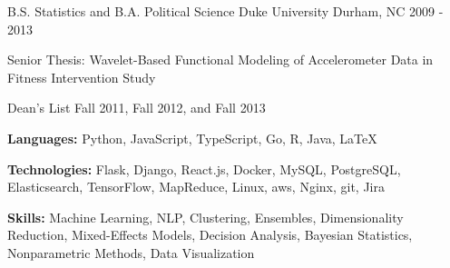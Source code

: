 \documentclass[11pt, a4paper]{awesome-cv}
\begin{document}
\makecvheader

\begin{cventries}
  \vspace{.5 mm}
  \cventry
    {B.S. Statistics and B.A. Political Science}
    {Duke University}
    {Durham, NC}
    {2009 - 2013}
    {
      \begin{cvitems}
        \item{Senior Thesis: Wavelet-Based Functional Modeling of Accelerometer Data
        in Fitness Intervention Study}
        \item{Dean’s List Fall 2011, Fall 2012, and Fall 2013}
      \end{cvitems}
    }
\end{cventries}

\begin{cventries}
  \cventry
    {}
    {}
    {}
    {}
    {
      \begin{cvitems}
        \item{\textbf{Languages:} Python, JavaScript, TypeScript, Go, R, Java, \LaTeX}
        \item{\textbf{Technologies:} Flask, Django, React.js, Docker, MySQL, PostgreSQL, Elasticsearch, TensorFlow, MapReduce, Linux, aws, Nginx, git, Jira}
        \item{\textbf{Skills:} Machine Learning, NLP, Clustering, Ensembles, Dimensionality Reduction, Mixed-Effects Models, Decision Analysis, Bayesian Statistics, Nonparametric Methods, Data Visualization}
      \end{cvitems}
    }
\end{cventries}
\end{document}
